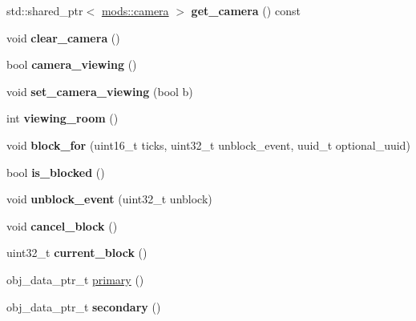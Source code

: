 \begin{DoxyCompactItemize}
std\+::shared\+\_\+ptr$<$ \hyperlink{classmods_1_1camera}{mods\+::camera} $>$ {\bfseries get\+\_\+camera} () const
\item 
\mbox{\label{classmods_1_1player_a22d85a409c50a67837d1e2faab1bf0bb}} 
void {\bfseries clear\+\_\+camera} ()
\item 
\mbox{\label{classmods_1_1player_af5c20d74a8a7d68ee0d63517145aa002}} 
bool {\bfseries camera\+\_\+viewing} ()
\item 
\mbox{\label{classmods_1_1player_ab281ba48de0f14bab911f9804137b659}} 
void {\bfseries set\+\_\+camera\+\_\+viewing} (bool b)
\item 
\mbox{\label{classmods_1_1player_a72a0ca876e17e3802c39b48b84bfecf1}} 
int {\bfseries viewing\+\_\+room} ()
\item 
\mbox{\label{classmods_1_1player_a3835ab002b5095a596f421c262c6eac8}} 
void {\bfseries block\+\_\+for} (uint16\+\_\+t ticks, uint32\+\_\+t unblock\+\_\+event, uuid\+\_\+t optional\+\_\+uuid)
\item 
\mbox{\label{classmods_1_1player_a1fd569b4507c1e9beefea643672f7fb9}} 
bool {\bfseries is\+\_\+blocked} ()
\item 
\mbox{\label{classmods_1_1player_a5f0433a04d22c54caf333c7fd4aadf4c}} 
void {\bfseries unblock\+\_\+event} (uint32\+\_\+t unblock)
\item 
\mbox{\label{classmods_1_1player_a88b940f9690adca6648f0f55bf3e7df8}} 
void {\bfseries cancel\+\_\+block} ()
\item 
\mbox{\label{classmods_1_1player_a50c0e905eb53acc6abc01012704f8a70}} 
uint32\+\_\+t {\bfseries current\+\_\+block} ()
\item 
obj\+\_\+data\+\_\+ptr\+\_\+t \hyperlink{classmods_1_1player_a88891bc28021b56598229c3b8a122ef0}{primary} ()
\item 
\mbox{\label{classmods_1_1player_a118c02387c06c547b4d3c240f172fd18}} 
obj\+\_\+data\+\_\+ptr\+\_\+t {\bfseries secondary} ()

\end{DoxyCompactItemize}
